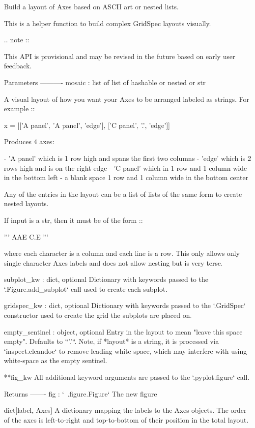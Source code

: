 \begin{DoxyVerb}Build a layout of Axes based on ASCII art or nested lists.

This is a helper function to build complex GridSpec layouts visually.

.. note ::

   This API is provisional and may be revised in the future based on
   early user feedback.


Parameters
----------
mosaic : list of list of {hashable or nested} or str

    A visual layout of how you want your Axes to be arranged
    labeled as strings.  For example ::

       x = [['A panel', 'A panel', 'edge'],
            ['C panel', '.',       'edge']]

    Produces 4 axes:

    - 'A panel' which is 1 row high and spans the first two columns
    - 'edge' which is 2 rows high and is on the right edge
    - 'C panel' which in 1 row and 1 column wide in the bottom left
    - a blank space 1 row and 1 column wide in the bottom center

    Any of the entries in the layout can be a list of lists
    of the same form to create nested layouts.

    If input is a str, then it must be of the form ::

      '''
      AAE
      C.E
      '''

    where each character is a column and each line is a row.
    This only allows only single character Axes labels and does
    not allow nesting but is very terse.

subplot_kw : dict, optional
    Dictionary with keywords passed to the `.Figure.add_subplot` call
    used to create each subplot.

gridspec_kw : dict, optional
    Dictionary with keywords passed to the `.GridSpec` constructor used
    to create the grid the subplots are placed on.

empty_sentinel : object, optional
    Entry in the layout to mean "leave this space empty".  Defaults
    to ``'.'``. Note, if *layout* is a string, it is processed via
    `inspect.cleandoc` to remove leading white space, which may
    interfere with using white-space as the empty sentinel.

**fig_kw
    All additional keyword arguments are passed to the
    `.pyplot.figure` call.

Returns
-------
fig : `~.figure.Figure`
   The new figure

dict[label, Axes]
   A dictionary mapping the labels to the Axes objects.  The order of
   the axes is left-to-right and top-to-bottom of their position in the
   total layout.\end{DoxyVerb}
 \mbox{\label{namespacematplotlib_1_1pyplot_a6385e746bd6fa92de71a857ba628218e}} 
